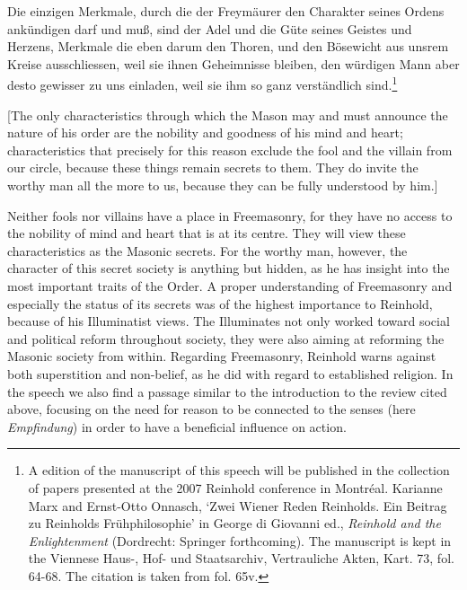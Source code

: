 Die einzigen Merkmale, durch die der Freym\"{a}urer den Charakter seines Ordens ank\"{u}ndigen darf und mu\ss{}, sind der Adel und die G\"{u}te seines Geistes und Herzens, Merkmale die eben darum den Thoren, und den B\"{o}sewicht aus unsrem Kreise ausschliessen, weil sie ihnen Geheimnisse bleiben, den w\"{u}rdigen Mann aber desto gewisser zu uns einladen, weil sie ihm so ganz verst\"{a}ndlich sind.\footnote{ A edition of the manuscript of this speech will be published in the collection of papers presented at the 2007 Reinhold conference in Montr\'{e}al. Karianne Marx and Ernst{-}Otto Onnasch, `Zwei Wiener Reden Reinholds. Ein Beitrag zu Reinholds Fr\"{u}hphilosophie' in George di Giovanni ed., \textit{Reinhold and the Enlightenment} (Dordrecht: Springer forthcoming). The manuscript is kept in the Viennese Haus{-}, Hof{-} und Staatsarchiv, Vertrauliche Akten, Kart. 73, fol. 64{-}68. The citation is taken from fol. 65v. }

[The only characteristics through which the Mason may and must announce the nature of his order are the nobility and goodness of his mind and heart; characteristics that precisely for this reason exclude the fool and the villain from our circle, because these things remain secrets to them. They do invite the worthy man all the more to us, because they can be fully understood by him.]

Neither fools nor villains have a place in Freemasonry, for they have no access to the nobility of mind and heart that is at its centre. They will view these characteristics as the Masonic secrets. For the worthy man, however, the character of this secret society is anything but hidden, as he has insight into the most important traits of the Order. A proper understanding of Freemasonry and especially the status of its secrets was of the highest importance to Reinhold, because of his Illuminatist views. The Illuminates not only worked toward social and political reform throughout society, they were also aiming at reforming the Masonic society from within. Regarding Freemasonry, Reinhold warns against both superstition and non{-}belief, as he did with regard to established religion. In the speech we also find a passage similar to the introduction to the review cited above, focusing on the need for reason to be connected to the senses (here \textit{Empfindung}) in order to have a beneficial influence on action. 

